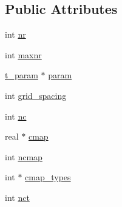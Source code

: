 \subsection*{\-Public \-Attributes}
\begin{DoxyCompactItemize}
\item 
int \hyperlink{structt__params_adb6ca69becaf8ee546ffe42b84c0aabb}{nr}
\item 
int \hyperlink{structt__params_a57fab6286d45622c20025b8f9f095565}{maxnr}
\item 
\hyperlink{structt__param}{t\-\_\-param} $\ast$ \hyperlink{structt__params_a3b593041a5e75fe27680d28b3becb027}{param}
\item 
int \hyperlink{structt__params_aaf4d196f4f14a60807ea0f99575ec172}{grid\-\_\-spacing}
\item 
int \hyperlink{structt__params_ad52c681ae342fda91ae2c0b3bcc0a906}{nc}
\item 
real $\ast$ \hyperlink{structt__params_a11323f589e20158e21e869fc9880f397}{cmap}
\item 
int \hyperlink{structt__params_a88fdbf63389fd20d1f072fbafc3d52d5}{ncmap}
\item 
int $\ast$ \hyperlink{structt__params_a21de709e673a13dc0069ed2a8adedace}{cmap\-\_\-types}
\item 
int \hyperlink{structt__params_af4a4c49f0c529976c1284e1ba0112834}{nct}
\end{DoxyCompactItemize}


